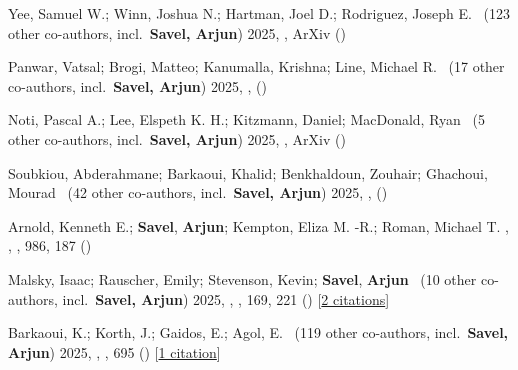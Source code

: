 \item[{\color{numcolor}\scriptsize51}] Yee, Samuel W.; Winn, Joshua N.; Hartman, Joel D.; Rodriguez, Joseph E. \etal\ ({123} other co-authors, incl.\ \textbf{Savel, Arjun}) 2025, , ArXiv ()

\item[{\color{numcolor}\scriptsize50}] Panwar, Vatsal; Brogi, Matteo; Kanumalla, Krishna; Line, Michael R. \etal\ ({17} other co-authors, incl.\ \textbf{Savel, Arjun}) 2025, , \mnras ()

\item[{\color{numcolor}\scriptsize49}] Noti, Pascal A.; Lee, Elspeth K. H.; Kitzmann, Daniel; MacDonald, Ryan \etal\ ({5} other co-authors, incl.\ \textbf{Savel, Arjun}) 2025, , ArXiv ()

\item[{\color{numcolor}\scriptsize48}] Soubkiou, Abderahmane; Barkaoui, Khalid; Benkhaldoun, Zouhair; Ghachoui, Mourad \etal\ ({42} other co-authors, incl.\ \textbf{Savel, Arjun}) 2025, , \mnras ()

\item[{\color{numcolor}\scriptsize47}] Arnold, Kenneth E.; \textbf{Savel}, \textbf{Arjun}; Kempton, Eliza M. -R.; Roman, Michael T. , , \apj, {986}, 187 ()

\item[{\color{numcolor}\scriptsize46}] Malsky, Isaac; Rauscher, Emily; Stevenson, Kevin; \textbf{Savel}, \textbf{Arjun} \etal\ ({10} other co-authors, incl.\ \textbf{Savel, Arjun}) 2025, , \aj, {169}, 221 () [\href{https://ui.adsabs.harvard.edu/abs/2025AJ....169..221M}{2 citations}]

\item[{\color{numcolor}\scriptsize45}] Barkaoui, K.; Korth, J.; Gaidos, E.; Agol, E. \etal\ ({119} other co-authors, incl.\ \textbf{Savel, Arjun}) 2025, , \aanda, {695} () [\href{https://ui.adsabs.harvard.edu/abs/2025A&A...695A.281B}{1 citation}]

